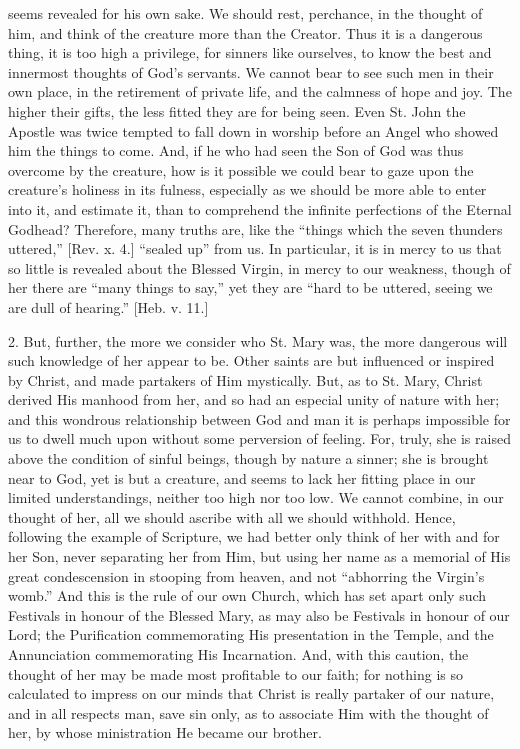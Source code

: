 seems revealed for his own sake. We should rest, perchance, in the
thought of him, and think of the creature more than the Creator. Thus it
is a dangerous thing, it is too high a privilege, for sinners like
ourselves, to know the best and innermost thoughts of God's servants. We
cannot bear to see such men in their own place, in the retirement of
private life, and the calmness of hope and joy. The higher their gifts,
the less fitted they are for being seen. Even St. John the Apostle was
twice tempted to fall down in worship before an Angel who showed him the
things to come. And, if he who had seen the Son of God was thus overcome
by the creature, how is it possible we could bear to gaze upon the
creature's holiness in its fulness, especially as we should be more able
to enter into it, and estimate it, than to comprehend the infinite
perfections of the Eternal Godhead? Therefore, many truths are, like the
``things which the seven thunders uttered,'' [Rev. x. 4.]
``sealed up'' from us. In particular, it is in mercy to us that
so little is revealed about the Blessed Virgin, in mercy to our
weakness, though of her there are ``many things to say,'' yet
they are ``hard to be uttered, seeing we are dull of hearing.''
[Heb. v. 11.]

2. But, further, the more we consider who St. Mary was, the more
dangerous will such knowledge of her appear to be. Other saints are but
influenced or inspired by Christ, and made partakers of Him mystically.
But, as to St. Mary, Christ derived His manhood from her, and so had an
especial unity of nature with her; and this wondrous relationship
between God and man it is perhaps impossible for us to dwell much upon
without some perversion of feeling. For, truly, she is raised above the
condition of sinful beings, though by nature a sinner; she is brought
near to God, yet is but a creature, and seems to lack her fitting place
in our limited understandings, neither too high nor too low. We cannot
combine, in our thought of her, all we should ascribe with all we should
withhold. Hence, following the example of Scripture, we had better only
think of her with and for her Son, never separating her from Him, but
using her name as a memorial of His great condescension in stooping from
heaven, and not ``abhorring the Virgin's womb.'' And this is the
rule of our own Church, which has set apart only such Festivals in
honour of the Blessed Mary, as may also be Festivals in honour of our
Lord; the Purification commemorating His presentation in the Temple, and
the Annunciation commemorating His Incarnation. And, with this caution,
the thought of her may be made most profitable to our faith; for nothing
is so calculated to impress on our minds that Christ is really partaker
of our nature, and in all respects man, save sin only, as to associate
Him with the thought of her, by whose ministration He became our
brother.

